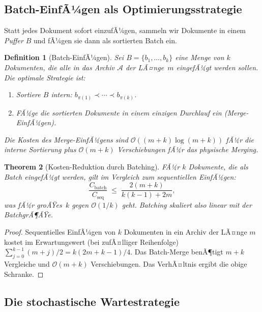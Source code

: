 ﻿\documentclass[12pt, a4paper]{article}
\newtheorem{theorem}{Theorem}[section]
\newtheorem{definition}[theorem]{Definition}
\begin{document}
\subsection{Batch-EinfÃ¼gen als Optimierungsstrategie}

Statt jedes Dokument sofort einzufÃ¼gen, sammeln wir Dokumente in einem
\emph{Puffer} $B$ und fÃ¼gen sie dann als sortierten Batch ein.

\begin{definition}[Batch-EinfÃ¼gen]\label{def:batch}
Sei $B = \{b_1, \ldots, b_k\}$ eine Menge von $k$ Dokumenten, die alle in das
Archiv $\mathcal{A}$ der LÃ¤nge~$m$ eingefÃ¼gt werden sollen. Die optimale
Strategie ist:
\begin{enumerate}[label=\arabic*.,noitemsep]
  \item Sortiere $B$ intern: $b_{\pi(1)} \prec \cdots \prec b_{\pi(k)}$.
  \item FÃ¼ge die sortierten Dokumente in einem einzigen Durchlauf ein
        (\emph{Merge-EinfÃ¼gen}).
\end{enumerate}
Die Kosten des Merge-EinfÃ¼gens sind $\mathcal{O}((m+k)\log(m+k))$ fÃ¼r die
interne Sortierung plus $\mathcal{O}(m+k)$ Verschiebungen fÃ¼r das physische
Merging.
\end{definition}

\begin{theorem}[Kosten-Reduktion durch Batching]\label{thm:batchreduction}
FÃ¼r $k$ Dokumente, die als Batch eingefÃ¼gt werden, gilt im Vergleich zum
sequentiellen EinfÃ¼gen:
\[
  \frac{C_{\mathrm{batch}}}{C_{\mathrm{seq}}} \;\leq\; \frac{2(m+k)}{k(k-1)+2m},
\]
was fÃ¼r groÃŸes~$k$ gegen $\mathcal{O}(1/k)$ geht. Batching skaliert also
linear mit der BatchgrÃ¶ÃŸe.
\end{theorem}

\begin{proof}
Sequentielles EinfÃ¼gen von $k$ Dokumenten in ein Archiv der LÃ¤nge $m$
kostet im Erwartungswert (bei zufÃ¤lliger Reihenfolge)
$\sum_{j=0}^{k-1}(m+j)/2 = k(2m+k-1)/4$. Das Batch-Merge benÃ¶tigt $m+k$
Vergleiche und $\mathcal{O}(m+k)$ Verschiebungen. Das VerhÃ¤ltnis ergibt die
obige Schranke.
\end{proof}

\subsection{Die stochastische Wartestrategie}\label{sec:waitstrat}
\end{document}
